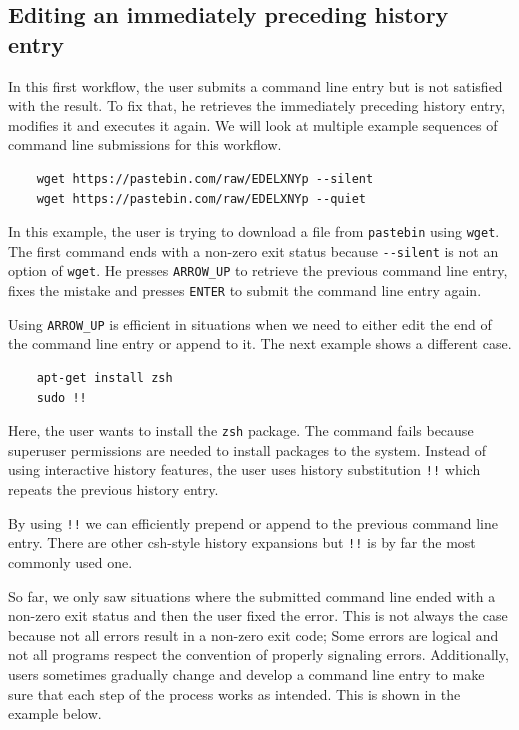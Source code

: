 
\subsection{Editing an immediately preceding history entry}

In this first workflow, the user submits a command line entry but is not satisfied with the result. To fix that, he retrieves the immediately preceding history entry, modifies it and executes it again. We will look at multiple example sequences of command line submissions for this workflow.

\begin{verbatim}
    wget https://pastebin.com/raw/EDELXNYp --silent
    wget https://pastebin.com/raw/EDELXNYp --quiet
\end{verbatim}
In this example, the user is trying to download a file from \verb|pastebin| using \verb|wget|. The first command ends with a non-zero exit status because \verb|--silent| is not an option of \verb|wget|. He presses \verb|ARROW_UP| to retrieve the previous command line entry, fixes the mistake and presses \verb|ENTER| to submit the command line entry again. 

Using \verb|ARROW_UP| is efficient in situations when we need to either edit the end of the command line entry or append to it. %
The next example shows a different case.

\begin{verbatim}
    apt-get install zsh
    sudo !!
\end{verbatim}

Here, the user wants to install the \verb|zsh| package. The command fails because superuser permissions are needed to install packages to the system. Instead of using interactive history features, the user uses history substitution \verb|!!| which repeats the previous history entry. 

By using \verb|!!| we can efficiently prepend or append to the previous command line entry. There are other csh-style history expansions but \verb|!!| is by far the most commonly used one. 

So far, we only saw situations where the submitted command line ended with a non-zero exit status and then the user fixed the error. This is not always the case because not all errors result in a non-zero exit code; Some errors are logical and not all programs respect the convention of properly signaling errors. Additionally, users sometimes gradually change and develop a command line entry to make sure that each step of the process works as intended. This is shown in the example below.

